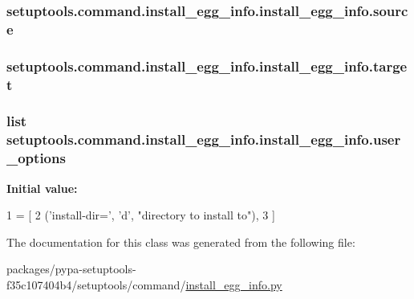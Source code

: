 \subsubsection[{source}]{\setlength{\rightskip}{0pt plus 5cm}setuptools.\+command.\+install\+\_\+egg\+\_\+info.\+install\+\_\+egg\+\_\+info.\+source}\label{classsetuptools_1_1command_1_1install__egg__info_1_1install__egg__info_a6c41d54fa446a81a3662d7b06e3e04cc}
\hypertarget{classsetuptools_1_1command_1_1install__egg__info_1_1install__egg__info_a4a124fe2c93cba2ffc46e4486919c9ce}{}
\subsubsection[{target}]{\setlength{\rightskip}{0pt plus 5cm}setuptools.\+command.\+install\+\_\+egg\+\_\+info.\+install\+\_\+egg\+\_\+info.\+target}\label{classsetuptools_1_1command_1_1install__egg__info_1_1install__egg__info_a4a124fe2c93cba2ffc46e4486919c9ce}
\hypertarget{classsetuptools_1_1command_1_1install__egg__info_1_1install__egg__info_ad5829c4f87296cefa96c29aa637226f0}{}
\subsubsection[{user\+\_\+options}]{\setlength{\rightskip}{0pt plus 5cm}list setuptools.\+command.\+install\+\_\+egg\+\_\+info.\+install\+\_\+egg\+\_\+info.\+user\+\_\+options\hspace{0.3cm}{\ttfamily [static]}}\label{classsetuptools_1_1command_1_1install__egg__info_1_1install__egg__info_ad5829c4f87296cefa96c29aa637226f0}
{\bfseries Initial value\+:}
\begin{DoxyCode}
1 = [
2         (\textcolor{stringliteral}{'install-dir='}, \textcolor{stringliteral}{'d'}, \textcolor{stringliteral}{"directory to install to"}),
3     ]
\end{DoxyCode}


The documentation for this class was generated from the following file\+:\begin{DoxyCompactItemize}
\item 
packages/pypa-\/setuptools-\/f35c107404b4/setuptools/command/\hyperlink{install__egg__info_8py}{install\+\_\+egg\+\_\+info.\+py}\end{DoxyCompactItemize}
